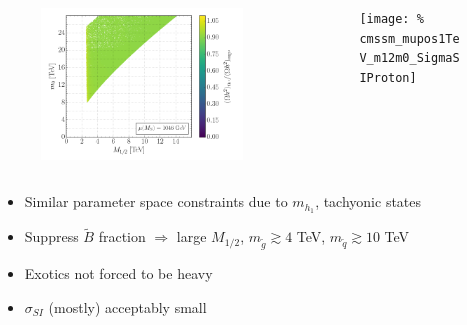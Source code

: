 \documentclass[10pt,aspectratio=169]{beamer}
\begin{document}
\begin{frame}
\begin{columns}[t]
\begin{column}{0.7\textwidth}
\begin{columns}[t]
\begin{column}{0.5\textwidth}
\begin{figure}
            \includegraphics[width=0.93\textwidth]{cmssm_mupos1TeV_m12m0_Omega}
          \end{figure}
        \end{column}
        \begin{column}{0.5\textwidth}
          \vspace{-20pt}
          \begin{figure}
            \centering
            \texttt{[image: \%
              cmssm\_mupos1TeV\_m12m0\_SigmaSIProton]}
          \end{figure}
        \end{column}
      \end{columns}
      \begin{itemize}\itemsep1em
        \item Similar parameter space constraints due to $m_{h_1}$,
          tachyonic states
        \item Suppress $\tilde{B}$ fraction $\Rightarrow$
          large $M_{1/2}$, {\color{red} $m_{\tilde{g}} \gtrsim 4$ TeV,
          $m_{\tilde{q}} \gtrsim 10$ TeV}
        \item {\color{blue} Exotics not forced to be heavy}
        \item $\sigma_{SI}$ (mostly) acceptably small
      \end{itemize}
    \end{column}
  \end{columns}
\end{frame}
\end{document}
